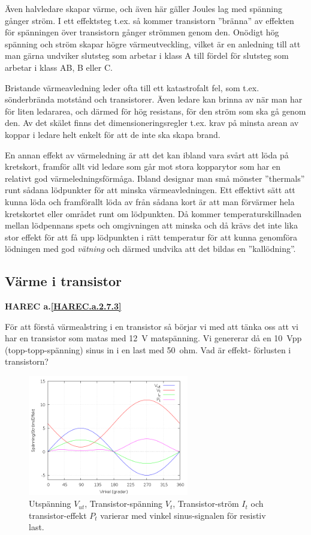 Även halvledare skapar värme, och även här gäller Joules lag med spänning
gånger ström. I ett effektsteg t.ex. så kommer transistorn ''bränna'' av
effekten för spänningen över transistorn gånger strömmen genom den. Onödigt
hög spänning och ström skapar högre värmeutveckling, vilket är en anledning
till att man gärna undviker slutsteg som arbetar i klass A till fördel för
slutsteg som arbetar i klass AB, B eller C.

Bristande värmeavledning leder ofta till ett katastrofalt fel, som t.ex.
sönderbrända motstånd och transistorer. Även ledare kan brinna av när man
har för liten ledararea, och därmed för hög resistans, för den ström som
ska gå genom den. Av det skälet finns det dimensioneringsregler t.ex.
krav på minsta arean av koppar i ledare helt enkelt för att de inte ska
skapa brand.

En annan effekt av värmeledning är att det kan ibland vara svårt att löda
på kretskort, framför allt vid ledare som går mot stora kopparytor som
har en relativt god värmeledningsförmåga. Ibland designar man små mönster
''thermals'' runt sådana lödpunkter för att minska värmeavledningen.
Ett effektivt sätt att kunna löda och framförallt löda av från sådana
kort är att man förvärmer hela kretskortet eller området runt om
lödpunkten. Då kommer temperaturskillnaden mellan lödpennans spets och
omgivningen att minska och då krävs det inte lika stor effekt för att få
upp lödpunkten i rätt temperatur för att kunna genomföra lödningen med god
\emph{vätning} och därmed undvika att det bildas en ''kallödning''.

\subsection{Värme i transistor}
\textbf{
HAREC a.\ref{HAREC.a.2.7.3}\label{myHAREC.a.2.7.3}
}

För att förstå värmealstring i en transistor så börjar vi med att tänka oss
att vi har en transistor som matas med 12~V matspänning. Vi genererar då en
10~Vpp (topp-topp-spänning) sinus in i en last med 50~ohm. Vad är effekt-
förlusten i transistorn?

\begin{figure}[ht]
\begin{center}
\includegraphics[width=7cm]{images/power1.png}
\caption{Utspänning $V_{ut}$, Transistor-spänning $V_t$, Transistor-ström $I_t$ och transistor-effekt $P_t$ varierar med vinkel sinus-signalen för resistiv last.}
\label{fig:power1}
\end{center}
\end{figure}

